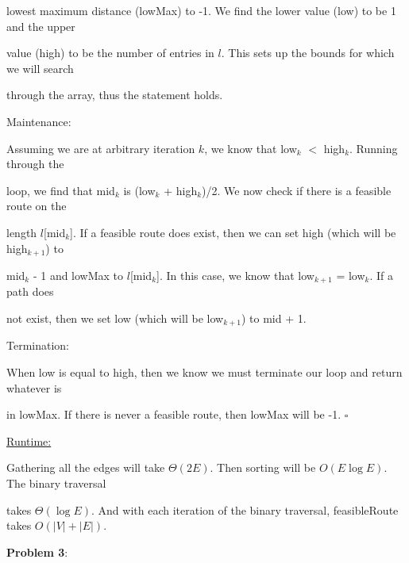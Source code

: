 \documentclass{article} %
\newcommand{\question}[2][]{\begin{flushleft}
        \textbf{Problem #1}: \textit{#2}

\end{flushleft}}
\begin{document}
    \hspace{5pt} lowest maximum distance (lowMax) to -1. We find the lower value (low) to be 1 and the upper 
    
    \hspace{5pt} value (high) to be the number of entries in $l$. This sets up the bounds for which we will search 
    
    \hspace{5pt} through the array, thus the statement holds. 

    Maintenance:

    \hspace{5pt} Assuming we are at arbitrary iteration $k$, we know that low$_k$ $<$ high$_k$. Running through the 
    
    \hspace{5pt} loop, we find that mid$_k$ is (low$_k$ + high$_k$)/2. We now check if there is a feasible route on the 
    
    \hspace{5pt} length $l$[mid$_k$]. If a feasible route does exist, then we can set high (which will be high$_{k+1}$) to 
    
    \hspace{5pt} mid$_k$ - 1 and lowMax to $l$[mid$_k$]. In this case, we know that low$_{k+1}$ = low$_k$. If a path does 
    
    \hspace{5pt} not exist, then we set low (which will be low$_{k+1}$) to mid + 1.

    Termination:

    \hspace{5pt} When low is equal to high, then we know we must terminate our loop and return whatever is 
    
    \hspace{5pt} in lowMax. If there is never a feasible route, then lowMax will be -1. $\square$

    \underline{Runtime:}

    Gathering all the edges will take $\Theta(2E)$. Then sorting will be $O(E \log E)$. The binary traversal 
    
    takes $\Theta(\log E)$. And with each iteration of the binary traversal, feasibleRoute takes $O(|V|+|E|)$.

    \newpage

    \question[3]{}
    
    \newpage

    
\end{document}
